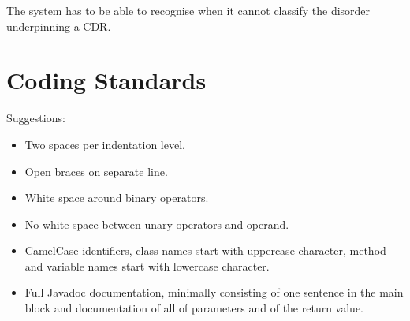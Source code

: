 \documentclass[a4paper,fleqn]{article}
\begin{document}
The system has to be able to recognise when it cannot classify the
disorder underpinning a CDR.


\section{Coding Standards}

Suggestions:

\begin{itemize}

\item Two spaces per indentation level.

\item Open braces on separate line.

\item White space around binary operators.

\item No white space between unary operators and operand.

\item CamelCase identifiers, class names start with uppercase
  character, method and variable names start with lowercase character.

\item Full Javadoc documentation, minimally consisting of one sentence
  in the main block and documentation of all of parameters and of the
  return value.

\end{itemize}
\end{document}

